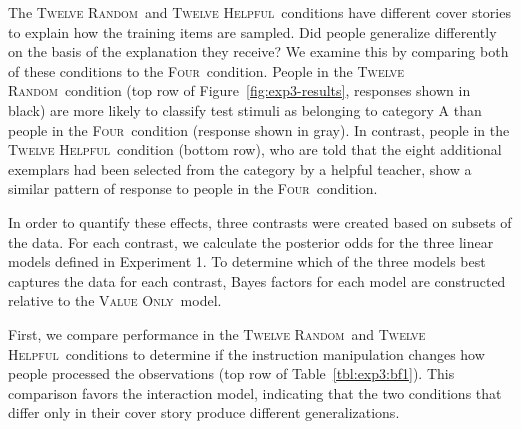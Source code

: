 \documentclass[doc,apacite]{apa6}
\newcommand{\four}{\textsc{Four}}
\newcommand{\random}{\textsc{Twelve Random}}
\newcommand{\helpful}{\textsc{Twelve Helpful}}
\newcommand{\neutral}{\textsc{Four}}
\newcommand{\valueonly}{\textsc{Value Only}}
\begin{document}
The \random\ and \helpful\ conditions have different cover stories to explain how the training items are sampled. Did people generalize differently on the basis of the explanation they receive?
We examine this by comparing both of these conditions to the \neutral\ condition.
People in the \random\ condition (top row of Figure~\ref{fig:exp3-results}, responses shown in black) are more likely to classify test stimuli as belonging to category A than people in the \neutral\ condition (response shown in gray).
%
In contrast, people in the \helpful\
condition (bottom row), who are told that the eight additional exemplars had been selected
from the category by a helpful teacher, show a similar pattern of response to people in the \neutral\ condition.

In order to quantify these effects, three contrasts were created based on subsets of the data.
For each contrast, we calculate the posterior odds for
the three linear models defined in Experiment 1.
To determine which of the three models best captures the data for each contrast, Bayes factors for each model are constructed relative to the \valueonly\ model.

First, we compare performance in the \random\ and \helpful\ conditions to determine if the instruction manipulation changes how people processed the observations (top row of Table~\ref{tbl:exp3:bf1}).
This comparison favors the interaction model, indicating that the two conditions that differ only in their cover story produce different generalizations.
\end{document}
